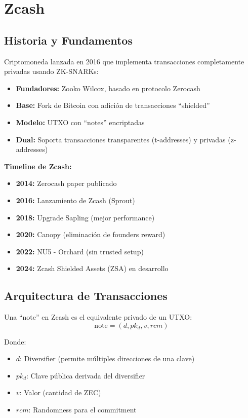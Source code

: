 \documentclass[11pt,a4paper,twoside]{book}
\begin{document}
\section{Zcash}
\label{sec:zcash}

\subsection{Historia y Fundamentos}

\begin{definition}[Zcash]
Criptomoneda lanzada en 2016 que implementa transacciones completamente privadas usando ZK-SNARKs:
\begin{itemize}
    \item \textbf{Fundadores:} Zooko Wilcox, basado en protocolo Zerocash
    \item \textbf{Base:} Fork de Bitcoin con adici\'on de transacciones ``shielded''
    \item \textbf{Modelo:} UTXO con ``notes'' encriptadas
    \item \textbf{Dual:} Soporta transacciones transparentes (t-addresses) y privadas (z-addresses)
\end{itemize}
\end{definition}

\begin{mathnote}
\textbf{Timeline de Zcash:}
\begin{itemize}
    \item \textbf{2014:} Zerocash paper publicado
    \item \textbf{2016:} Lanzamiento de Zcash (Sprout)
    \item \textbf{2018:} Upgrade Sapling (mejor performance)
    \item \textbf{2020:} Canopy (eliminaci\'on de founders reward)
    \item \textbf{2022:} NU5 - Orchard (sin trusted setup)
    \item \textbf{2024:} Zcash Shielded Assets (ZSA) en desarrollo
\end{itemize}
\end{mathnote}

\subsection{Arquitectura de Transacciones}

\begin{definition}
Una ``note'' en Zcash es el equivalente privado de un UTXO:
\[
\text{note} = (d, pk_d, v, rcm)
\]

Donde:
\begin{itemize}
    \item $d$: Diversifier (permite m\'ultiples direcciones de una clave)
    \item $pk_d$: Clave p\'ublica derivada del diversifier
    \item $v$: Valor (cantidad de ZEC)
    \item $rcm$: Randomness para el commitment
\end{itemize}
\end{definition}
\end{document}
